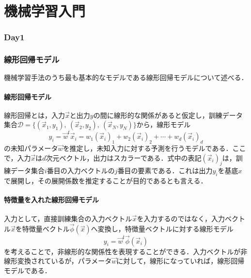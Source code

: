 \part{機械学習入門}
\section*{Day1}
\section{線形回帰モデル}
機械学習手法のうち最も基本的なモデルである線形回帰モデルについて述べる．

\subsection{線形回帰モデル}
線形回帰とは，入力$\vec{x}$と出力$y$の間に線形的な関係があると仮定し，訓練データ集合$\mathcal{D}=\{(\vec{x}_1,y_1),\ (\vec{x}_2,y_2),\ (\vec{x}_N,y_N)\}$から，線形モデル
\begin{equation}
    y_i = \vec{w}^{t}\vec{x}_i
    =w_1(\vec{x}_i)_{1}+w_2(\vec{x}_i)_{2}+\cdots+w_d(\vec{x}_i)_{d}
\end{equation}
の未知パラメータ$\vec{w}$を推定し，未知入力に対する予測を行うモデルである．ここで，入力$\vec{x}$は$d$次元ベクトル，出力はスカラーである．式中の表記$(\vec{x}_i)_{j}$は，訓練データ集合$i$番目の入力ベクトルの$j$番目の要素である．これは出力$y_i$を基底$x$で展開し，その展開係数を推定することが目的であるとも言える．


\subsection{特徴量を入れた線形回帰モデル}
入力として，直接訓練集合の入力ベクトル$\vec{x}$を入力するのではなく，入力ベクトル$\vec{x}$を特徴量ベクトル$\vec{\phi}(\vec{x})$へ変換し，特徴量ベクトルに対する線形モデル
\begin{equation}
    y_i = \vec{w}^{t}\vec{\phi}(\vec{x}_i)
\end{equation}
を考えることで，非線形的な関係性を表現することができる．入力ベクトルが非線形変換されているが，パラメータ$\vec{w}$に対して，線形になっていれば，線形回帰モデルである．
